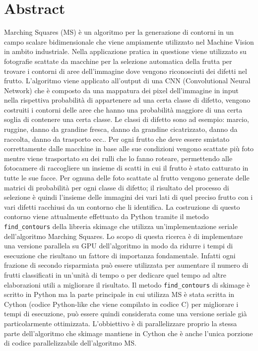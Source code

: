 \documentclass[12pt,a4paper]{report}
\begin{document}
\chapter{Abstract}
Marching Squares (MS) è un algoritmo per la generazione di contorni in un campo scalare bidimensionale che viene ampiamente utilizzato nel Machine Vision in ambito industriale. Nella applicazione pratica in questione viene utilizzato su fotografie scattate da macchine per la selezione automatica della frutta per trovare i contorni di aree dell'immagine dove vengono riconosciuti dei difetti nel frutto. L'algoritmo viene applicato all'output di una CNN (Convolutional Neural Network) che è composto da una mappatura dei pixel dell'immagine in input nella rispettiva probabilità di appartenere ad una certa classe di difetto, vengono costruiti i contorni delle aree che hanno una probabilità maggiore di una certa soglia di contenere una certa classe. Le classi di difetto sono ad esempio: marcio, ruggine, danno da grandine fresca, danno da grandine cicatrizzato, danno da raccolta, danno da trasporto ecc.. \newline
Per ogni frutto che deve essere smistato correttamente dalle macchine in base alle sue condizioni vengono scattate più foto mentre viene trasportato su dei rulli che lo fanno roteare, permettendo alle fotocamere di raccogliere un insieme di scatti in cui il frutto è stato catturato in tutte le sue facce. Per ognuna delle foto scattate al frutto vengono generate delle matrici di probabilità per ogni classe di difetto; il risultato del processo di selezione è quindi l'insieme delle immagini dei vari lati di quel preciso frutto con i vari difetti racchiusi da un contorno che li identifica. \newline 
La costruzione di questo contorno viene attualmente effettuato da Python tramite il metodo \verb|find_contours| della libreria skimage che utilizza un'implementazione seriale dell'algoritmo Marching Squares. Lo scopo di questa ricerca è di implementare una versione parallela su GPU dell'algoritmo in modo da ridurre i tempi di esecuzione che risultano un fattore di importanza fondamentale.  Infatti ogni frazione di secondo risparmiata può essere utilizzata per aumentare il numero di frutti classificati in un'unità di tempo o per dedicare quel tempo ad altre elaborazioni utili a migliorare il risultato. 
Il metodo \verb|find_contours| di skimage è scritto in Python ma la parte principale in cui utilizza MS è stata scritta in Cython (codice Python-like che viene compilato in codice C) per migliorare i tempi di esecuzione, può essere quindi considerata come una versione seriale già particolarmente ottimizzata. \newline L'obbiettivo è di parallelizzare proprio la stessa parte dell'algoritmo che skimage mantiene in Cython che è anche l'unica porzione di codice parallelizzabile dell'algoritmo MS. \newline
\end{document}
